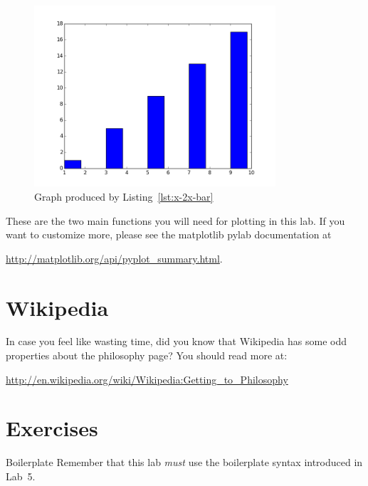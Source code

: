 \documentclass[11pt]{cselabheader}
\begin{document}
\begin{figure}[!ht]
  \centering
  \includegraphics[width=0.8\textwidth]{lab11/x-2x-bar-plot.png}
  \caption{Graph produced by Listing~\ref{lst:x-2x-bar}}
  \label{fig:x-2x-bar}
\end{figure}

These are the two main functions you will need for plotting in this lab. If you
want to customize more, please see the matplotlib pylab documentation at
\begin{center}
  \url{http://matplotlib.org/api/pyplot_summary.html}.
\end{center}

\pagebreak
\section{Wikipedia}

In case you feel like wasting time, did you know that Wikipedia has some odd
properties about the philosophy page? You should read more at:

\begin{center}
  \url{http://en.wikipedia.org/wiki/Wikipedia:Getting_to_Philosophy}
\end{center}

\section{Exercises}
\label{sec:ex}


\begin{warningbox}{Boilerplate}
  Remember that this lab \emph{must} use the
  boilerplate syntax introduced in Lab~5.
\end{warningbox}
\end{document}
